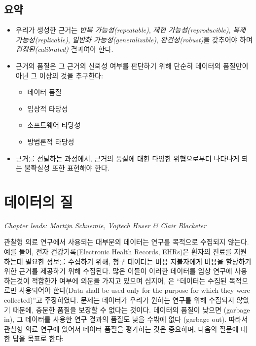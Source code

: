 \documentclass[11pt]{book}
\providecommand{\tightlist}{%
  \setlength{\itemsep}{0pt}\setlength{\parskip}{0pt}}
\theoremstyle{definition}
\theoremstyle{definition}
\theoremstyle{definition}
\theoremstyle{remark}
\let\BeginKnitrBlock\begin \let\EndKnitrBlock\end
\begin{document}
\section{요약}\label{-12}

\BeginKnitrBlock{rmdsummary}
\begin{itemize}
\item
  우리가 생성한 근거는 \emph{반복 가능성(repeatable)}, \emph{재현
  가능성(reproducible)}, \emph{복제 가능성(replicable)}, \emph{일반화
  가능성(generalizable)}, \emph{완건성(robust)}을 갖추어야 하며
  \emph{검정된(calibrated)} 결과여야 한다.
\item
  근거의 품질은 그 근거의 신뢰성 여부를 판단하기 위해 단순히 데이터의
  품질만이 아닌 그 이상의 것을 추구한다:

  \begin{itemize}
  \tightlist
  \item
    데이터 품질
  \item
    임상적 타당성
  \item
    소프트웨어 타당성
  \item
    방법론적 타당성
  \end{itemize}
\item
  근거를 전달하는 과정에서, 근거의 품질에 대한 다양한 위협으로부터
  나타나게 되는 불확실성 또한 표현해야 한다.
\end{itemize}
\EndKnitrBlock{rmdsummary}

\chapter{데이터의 질}\label{DataQuality}

\emph{Chapter leads: Martijn Schuemie, Vojtech Huser \& Clair Blacketer}

관찰형 의료 연구에서 사용되는 대부분의 데이터는 연구를 목적으로 수집되지
않는다. 예를 들어, 전자 건강기록(Electronic Health Records, EHRs)은
환자의 진료를 지원하는데 필요한 정보를 수집하기 위해, 청구 데이터는 비용
지불자에게 비용을 할당하기 위한 근거를 제공하기 위해 수집된다. 많은
이들이 이러한 데이터를 임상 연구에 사용하는것이 적합한가 여부에 의문을
가지고 있으며 심지어, \citet{vanDerLei_1991} 은 ``데이터는 수집된
목적으로만 사용되어야 한다(Data shall be used only for the purpose for
which they were collected)''고 주장하였다. 문제는 데이터가 우리가 원하는
연구를 위해 수집되지 않았기 때문에, 충분한 품질을 보장할 수 없다는
것이다. 데이터의 품질이 낮으면 (garbage in), 그 데이터를 사용한 연구
결과의 품질도 낮을 수밖에 없다 (garbage out). 따라서 관찰형 의료 연구에
있어서 데이터 품질을 평가하는 것은 중요하며, 다음의 질문에 대한 답을
목표로 한다:
\end{document}
